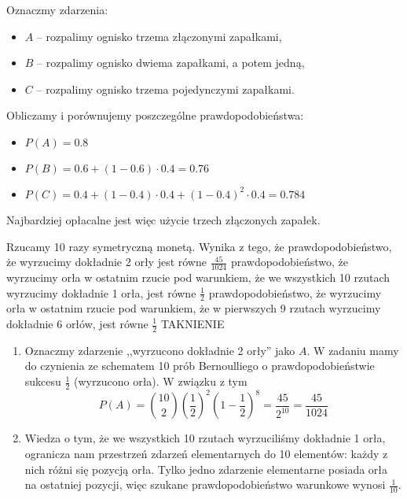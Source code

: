 \begin{solutions}
    Oznaczmy zdarzenia:
    \begin{itemize}
        \item $A$ -- rozpalimy ognisko trzema złączonymi zapałkami,
        \item $B$ -- rozpalimy ognisko dwiema zapałkami, a potem jedną,
        \item $C$ -- rozpalimy ognisko trzema pojedynczymi zapałkami.
    \end{itemize}

    Obliczamy i porównujemy poszczególne prawdopodobieństwa:
    \begin{itemize}
        \item $P(A) = 0.8$
        \item $P(B) = 0.6 + (1 - 0.6) \cdot 0.4 = 0.76$ 
        \item $P(C) = 0.4 + (1 - 0.4) \cdot 0.4 + (1 - 0.4)^2 \cdot 0.4 = 0.784$ 
    \end{itemize}

    Najbardziej opłacalne jest więc użycie trzech złączonych zapałek.

    \sol Rzucamy 10 razy symetryczną monetą. Wynika z tego, że
    \answerss
    {prawdopodobieństwo, że wyrzucimy dokładnie 2 orły jest równe $\frac{45}{1024}$}
    {prawdopodobieństwo, że wyrzucimy orła w ostatnim rzucie pod warunkiem, że we wszystkich 10 rzutach wyrzucimy dokładnie 1 orła, jest równe $\frac{1}{2}$}
    {prawdopodobieństwo, że wyrzucimy orła w ostatnim rzucie pod warunkiem, że w pierwszych 9 rzutach wyrzucimy dokładnie 6 orłów, jest równe $\frac{1}{2}$}
    {TAK}{NIE}{NIE}

    \begin{enumerate}[\bf A.]
        \item Oznaczmy zdarzenie ,,wyrzucono dokładnie 2 orły'' jako $A$. W zadaniu mamy do czynienia ze schematem 10 prób Bernoulliego o prawdopodobieństwie sukcesu $\frac{1}{2}$ (wyrzucono orła). W związku z tym
        $$P(A) = \binom{10}{2} \left(\frac{1}{2}\right)^2 \left(1 - \frac{1}{2}\right)^8 = \frac{45}{2^{10}} = \frac{45}{1024}$$

        \item Wiedza o tym, że we wszystkich 10 rzutach wyrzuciliśmy dokładnie 1 orła, ogranicza nam przestrzeń zdarzeń elementarnych do 10 elementów: każdy z nich różni się pozycją orła. Tylko jedno zdarzenie elementarne posiada orła na ostatniej pozycji, więc szukane prawdopodobieństwo warunkowe wynosi $\frac{1}{10}$.


\end{enumerate}
\end{solutions}
